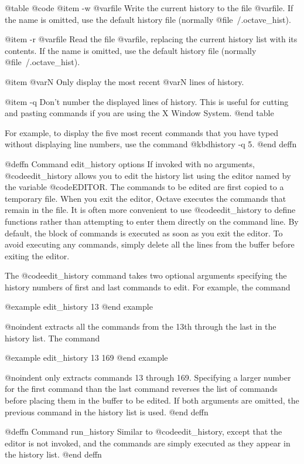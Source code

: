 @table @code
@item -w @var{file}
Write the current history to the file @var{file}.  If the name is
omitted, use the default history file (normally @file{~/.octave_hist}).

@item -r @var{file}
Read the file @var{file}, replacing the current history list with its
contents.  If the name is omitted, use the default history file
(normally @file{~/.octave_hist}).

@item @var{N}
Only display the most recent @var{N} lines of history.

@item -q
Don't number the displayed lines of history.  This is useful for cutting
and pasting commands if you are using the X Window System.
@end table

For example, to display the five most recent commands that you have
typed without displaying line numbers, use the command
@kbd{history -q 5}.
@end deffn

@deffn {Command} edit_history options
If invoked with no arguments, @code{edit_history} allows you to edit the
history list using the editor named by the variable @code{EDITOR}.  The
commands to be edited are first copied to a temporary file.  When you
exit the editor, Octave executes the commands that remain in the file.
It is often more convenient to use @code{edit_history} to define functions 
rather than attempting to enter them directly on the command line.
By default, the block of commands is executed as soon as you exit the
editor.  To avoid executing any commands, simply delete all the lines
from the buffer before exiting the editor.

The @code{edit_history} command takes two optional arguments specifying
the history numbers of first and last commands to edit.  For example,
the command

@example
edit_history 13
@end example

@noindent
extracts all the commands from the 13th through the last in the history
list.  The command

@example
edit_history 13 169
@end example

@noindent
only extracts commands 13 through 169.  Specifying a larger number for
the first command than the last command reverses the list of commands
before placing them in the buffer to be edited.  If both arguments are
omitted, the previous command in the history list is used.
@end deffn

@deffn {Command} run_history
Similar to @code{edit_history}, except that the editor is not invoked,
and the commands are simply executed as they appear in the history list.
@end deffn

